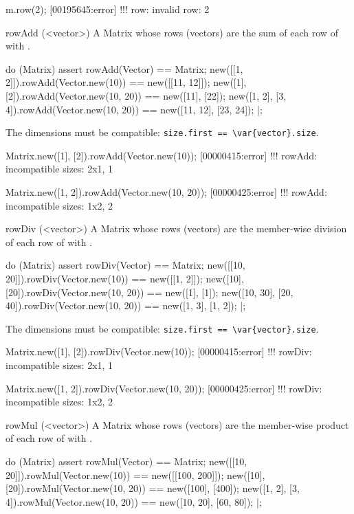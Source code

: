\begin{urbiscriptapi}
\begin{urbiassert}
m.row(2);
[00195645:error] !!! row: invalid row: 2
\end{urbiassert}


\item[rowAdd](<vector>)%
  A Matrix whose rows (vectors) are the sum of each row of \this with
  .
\begin{urbiscript}
do (Matrix)
{
  assert
  {
    rowAdd(Vector) == Matrix;
    new([[1, 2]]).rowAdd(Vector.new(10))     == new([[11, 12]]);
    new([1], [2]).rowAdd(Vector.new(10, 20)) == new([11], [22]);
    new([1, 2], [3, 4]).rowAdd(Vector.new(10, 20)) == new([11, 12], [23, 24]);
  }
}|;
\end{urbiscript}

  The dimensions must be compatible:
  \lstinline|size.first == \var{vector}.size|.
\begin{urbiscript}
Matrix.new([1], [2]).rowAdd(Vector.new(10));
[00000415:error] !!! rowAdd: incompatible sizes: 2x1, 1

Matrix.new([1, 2]).rowAdd(Vector.new(10, 20));
[00000425:error] !!! rowAdd: incompatible sizes: 1x2, 2
\end{urbiscript}


\item[rowDiv](<vector>)%
  A Matrix whose rows (vectors) are the member-wise division of each row of
  \this with .
\begin{urbiscript}
do (Matrix)
{
  assert
  {
    rowDiv(Vector) == Matrix;
    new([[10, 20]]).rowDiv(Vector.new(10))     == new([[1, 2]]);
    new([10], [20]).rowDiv(Vector.new(10, 20)) == new([1], [1]);
    new([10, 30], [20, 40]).rowDiv(Vector.new(10, 20)) == new([1, 3], [1, 2]);
  }
}|;
\end{urbiscript}

  The dimensions must be compatible:
  \lstinline|size.first == \var{vector}.size|.
\begin{urbiscript}
Matrix.new([1], [2]).rowDiv(Vector.new(10));
[00000415:error] !!! rowDiv: incompatible sizes: 2x1, 1

Matrix.new([1, 2]).rowDiv(Vector.new(10, 20));
[00000425:error] !!! rowDiv: incompatible sizes: 1x2, 2
\end{urbiscript}


\item[rowMul](<vector>)%
  A Matrix whose rows (vectors) are the member-wise product of each row of
  \this with .
\begin{urbiscript}
do (Matrix)
{
  assert
  {
    rowMul(Vector) == Matrix;
    new([[10, 20]]).rowMul(Vector.new(10))     == new([[100, 200]]);
    new([10], [20]).rowMul(Vector.new(10, 20)) == new([100], [400]);
    new([1, 2], [3, 4]).rowMul(Vector.new(10, 20)) == new([10, 20], [60, 80]);
  }
}|;
\end{urbiscript}


\end{urbiscriptapi}
